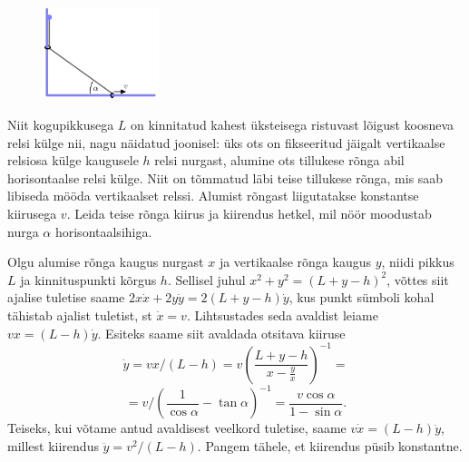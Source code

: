 
\begin{figure}
	\vspace{-13pt}
	\includegraphics[width=0.3\textwidth]{2019-lahg-07-yl.pdf}
\end{figure}

Niit kogupikkusega $L$ on kinnitatud kahest üksteisega ristuvast lõigust koosneva relsi külge nii, nagu näidatud joonisel: üks ots on fikseeritud jäigalt vertikaalse relsiosa külge kaugusele $h$ relsi nurgast, alumine ots tillukese rõnga abil horisontaalse relsi külge. Niit on tõmmatud läbi teise tillukese rõnga, mis saab libiseda mööda vertikaalset relssi. Alumist rõngast liigutatakse konstantse kiirusega $v$. Leida teise rõnga kiirus ja kiirendus hetkel, mil nöör moodustab nurga $\alpha$ horisontaalsihiga.


\hint

\solu
Olgu alumise rõnga kaugus nurgast $x$ ja vertikaalse rõnga kaugus $y$, niidi pikkus $L$ ja kinnituspunkti kõrgus $h$. Sellisel juhul $x^2+y^2=(L+y-h)^2$, võttes siit ajalise tuletise saame $2x\dot x+2y\dot y=2(L+y-h)\dot y$, kus punkt sümboli kohal tähistab ajalist tuletist, st $\dot x=v$. Lihtsustades seda avaldist leiame $vx=(L-h)\dot y$. Esiteks saame siit avaldada otsitava kiiruse
$$
\dot y=vx/(L-h)=v\left(\frac{L+y-h}{x-\frac yx}\right)^{-1}=
$$
$$
=v/(\frac 1{\cos\alpha}-\tan\alpha)^{-1}=\frac{v\cos\alpha}{1-\sin\alpha}.
$$
Teiseks, kui võtame antud avaldisest veelkord tuletise, saame $v\dot x=(L-h)\ddot y$, millest kiirendus $\ddot y=v^2/(L-h)$. Pangem tähele, et kiirendus püsib konstantne.
\probend